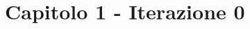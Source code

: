 \documentclass[a4paper,titlepage]{report}
\begin{document}
\chapter*{Capitolo 1 - Iterazione 0}


\end{document}
